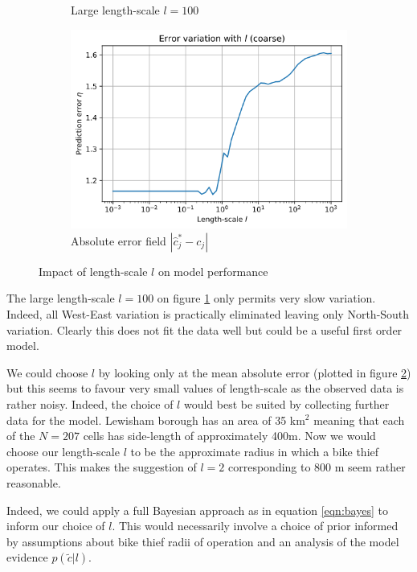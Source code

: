 \documentclass[]{article}
\begin{document}
\begin{figure}[!h]
\begin{subfigure}{0.32\linewidth}
		\caption{Large length-scale $l=100$}
		\label{fig:l-big}
	\end{subfigure}
	\begin{subfigure}{0.32\linewidth}
		\includegraphics[width=\linewidth]{error-with-l.png}
		\caption{Absolute error field $|\hat{c}^*_j - c_j|$}
		\label{fig:error-with-l}
	\end{subfigure}
	\caption{Impact of length-scale $l$ on model performance}
	\label{fig:l-effect-bikes}
\end{figure}

The large length-scale $l=100$ on figure \ref{fig:l-big} only permits very slow variation. Indeed, all West-East variation is practically eliminated leaving only North-South variation. Clearly this does not fit the data well but could be a useful first order model.

We could choose $l$ by looking only at the mean absolute error (plotted in figure \ref{fig:error-with-l}) but this seems to favour very small values of length-scale as the observed data is rather noisy. Indeed, the choice of $l$ would best be suited by collecting further data for the model. Lewisham borough has an area of 35 km$^2$ meaning that each of the $N=207$ cells has side-length of approximately 400m. Now we would choose our length-scale $l$ to be the approximate radius in which a bike thief operates. This makes the suggestion of $l=2$ corresponding to 800 m seem rather reasonable.

Indeed, we could apply a full Bayesian approach as in equation \ref{eqn:bayes} to inform our choice of $l$. This would necessarily involve a choice of prior informed by assumptions about bike thief radii of operation and an analysis of the model evidence $p(\tilde{c} | l)$.
\end{document}
